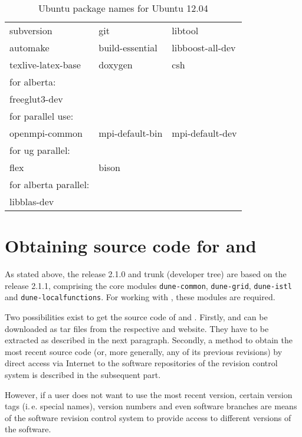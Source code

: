 \begin{table}
\centering
\begin{tabular}{lll}
subversion & git & libtool \\
automake & build-essential & libboost-all-dev \\
texlive-latex-base & doxygen & csh\\
\hline
for alberta: & & \\
freeglut3-dev & & \\
\hline
for parallel use: & & \\
openmpi-common & mpi-default-bin & mpi-default-dev \\
\hline
for ug parallel: & & \\
flex & bison & \\
\hline 
for alberta parallel: & & \\
libblas-dev & & \\
\end{tabular}
\caption{Ubuntu package names for Ubuntu 12.04}
\label{tbl:ubuntu-pkg}
\end{table}

\section{Obtaining source code for \Dune and \Dumux}
As stated above, the \Dumux release 2.1.0 and trunk (developer tree) are based on the \Dune release 2.1.1, 
comprising the core modules \texttt{dune-common}, \texttt{dune-grid}, \texttt{dune-istl} and \texttt{dune-localfunctions}.
For working with \Dumux, these modules are required.

Two possibilities exist to get the source code of \Dune and \Dumux.
Firstly, \Dune and \Dumux can be downloaded as tar files from the respective \Dune and \Dumux website. They have to be extracted as described in the next paragraph.
Secondly, a method to obtain the most recent source code (or, more generally, any of its previous revisions) by direct access 
via Internet to the software repositories of the revision control system is described in the subsequent part. 

However, if a user does not want to use the most recent version,
certain version tags (i.\,e. special names), version numbers and even software branches are means 
of the software revision control system to provide access to different versions of the software.

